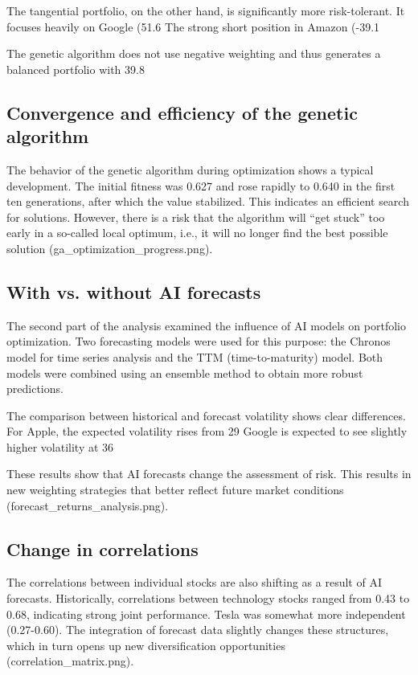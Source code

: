 \documentclass{agasthesis}
\begin{document}
The tangential portfolio, on the other hand, is significantly more risk-tolerant. It focuses heavily on Google (51.6%
The strong short position in Amazon (-39.1%

The genetic algorithm does not use negative weighting and thus generates a balanced portfolio with 39.8%
\subsection{Convergence and efficiency of the genetic algorithm}
The behavior of the genetic algorithm during optimization shows a typical development. The initial fitness was 0.627 and rose rapidly to 0.640 in the first ten generations, 
after which the value stabilized. This indicates an efficient search for solutions. However, there is a risk that the algorithm will “get stuck” too early in a so-called local optimum, 
i.e., it will no longer find the best possible solution (ga_optimization_progress.png).

\subsection{With vs. without AI forecasts}
The second part of the analysis examined the influence of AI models on portfolio optimization. Two forecasting models were used for this purpose: 
the Chronos model for time series analysis and the TTM (time-to-maturity) model. Both models were combined using an ensemble method to obtain more robust predictions.

The comparison between historical and forecast volatility shows clear differences. For Apple, the expected volatility rises from 29%
Google is expected to see slightly higher volatility at 36%

These results show that AI forecasts change the assessment of risk. This results in new weighting strategies that better reflect future market conditions (forecast_returns_analysis.png).

\subsection{Change in correlations}
The correlations between individual stocks are also shifting as a result of AI forecasts. Historically, correlations between technology stocks ranged from 0.43 to 0.68, 
indicating strong joint performance. Tesla was somewhat more independent (0.27-0.60). The integration of forecast data slightly changes these structures, which in turn opens up 
new diversification opportunities (correlation_matrix.png).
\end{document}
